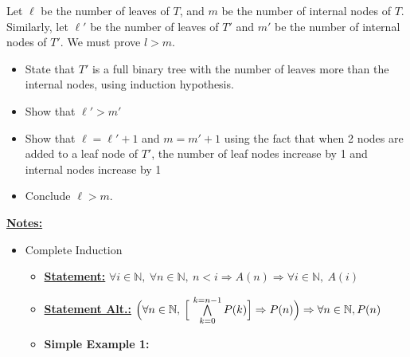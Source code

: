 \documentclass[12pt]{article}
\begin{document}
\begin{itemize}
\begin{mdframed}
\begin{enumerate}[1.]
            \bigskip

            Let $\ell$ be the number of leaves of $T$, and $m$ be the number of
            internal nodes of $T$. Similarly, let $\ell'$ be the number of leaves of
            $T'$ and $m'$ be the number of internal nodes of $T'$. We must prove
            $l > m$.

            \bigskip

            \begin{itemize}
                \item State that $T'$ is a full binary tree with the number of
                leaves more than the internal nodes, using induction hypothesis.
                \item Show that $\ell' > m'$
                \item Show that $\ell = \ell' + 1$ and $m = m' + 1$ using the fact that
                when 2 nodes are added to a leaf node of $T'$, the number of leaf
                nodes increase by 1 and internal nodes increase by 1
                \item Conclude $\ell > m$.
            \end{itemize}

        \end{enumerate}

    \end{mdframed}

    \bigskip

    \underline{\textbf{Notes:}}

    \bigskip

    \begin{itemize}
        \item Complete Induction
        \begin{itemize}
            \item \underline{\textbf{Statement:}} $\forall i \in \mathbb{N},\:\forall n \in \mathbb{N},\:n < i \Rightarrow A(n) \Rightarrow \forall i \in \mathbb{N},\:A(i)$
            \item \underline{\textbf{Statement Alt.:}} $\Bigl(\forall n \in \mathbb{N},\:\Bigl[ \ \bigwedge\limits_{k = 0}^{k=n-1} P(k) \Bigr] \Rightarrow P(n) \Bigr) \Rightarrow \forall n \in \mathbb{N}, P(n)$
            \item

            \begin{mdframed}
                \textbf{Simple Example 1:}

                \bigskip


\end{mdframed}
\end{itemize}
\end{itemize}
\end{itemize}
\end{document}
